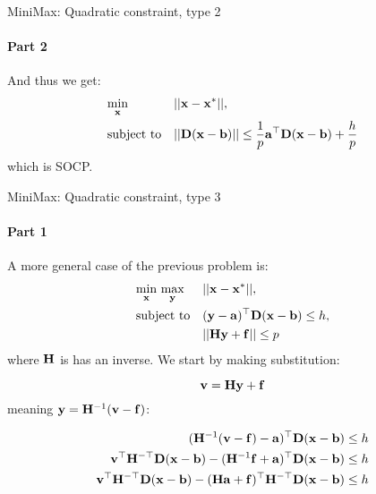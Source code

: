 \documentclass{beamer}
\begin{document}
\begin{frame}{MiniMax: Quadratic constraint, type 2}
\framesubtitle{Part 2}
\begin{flushleft}

And thus we get:
%
\begin{equation}
\begin{aligned}
& \underset{\mathbf{x}}{\text{min}}
& & ||\mathbf{x} - \mathbf{x}^*||, \\
& \text{subject to}
& & || \mathbf{D} (\mathbf{x} - \mathbf{b}) ||  \leq \frac{1}{p}\mathbf{a}^\top \mathbf{D} (\mathbf{x} - \mathbf{b}) + \frac{h}{p}
\end{aligned}
\end{equation}
%
which is SOCP. 
 
\end{flushleft}
\end{frame}






\begin{frame}{MiniMax: Quadratic constraint, type 3}
\framesubtitle{Part 1}
\begin{flushleft}

A more general case of the previous problem is:
%
\begin{equation}
\begin{aligned}
& \underset{\mathbf{x}}{\text{min}} \ \underset{\mathbf{y}}{\text{max}}
& & ||\mathbf{x} - \mathbf{x}^*||, \\
& \text{subject to}
& & (\mathbf{y} - \mathbf{a})^\top \mathbf{D} (\mathbf{x} - \mathbf{b}) \leq h, \\
& & & ||\mathbf{H}\mathbf{y} + \mathbf{f}|| \leq p
\end{aligned}
\end{equation}
%
where $\mathbf{H}$ is has an inverse. We start by making substitution:

\begin{equation}
    \mathbf{v} = \mathbf{H}\mathbf{y} + \mathbf{f}
\end{equation}
%
meaning $\mathbf{y} = \mathbf{H}^{-1}(\mathbf{v} -\mathbf{f})$:

\begin{align}
    (\mathbf{H}^{-1}(\mathbf{v} -\mathbf{f}) - \mathbf{a})^\top \mathbf{D} (\mathbf{x} - \mathbf{b}) \leq h \\
    \mathbf{v}^\top \mathbf{H}^{-\top} \mathbf{D} (\mathbf{x} - \mathbf{b}) - (\mathbf{H}^{-1}\mathbf{f} + \mathbf{a})^\top \mathbf{D} (\mathbf{x} - \mathbf{b}) \leq h\\
    \mathbf{v}^\top \mathbf{H}^{-\top} \mathbf{D} (\mathbf{x} - \mathbf{b}) - (\mathbf{H}\mathbf{a} + \mathbf{f})^\top \mathbf{H}^{-\top}\mathbf{D} (\mathbf{x} - \mathbf{b}) \leq h
\end{align}

 
\end{flushleft}
\end{frame}
\end{document}
